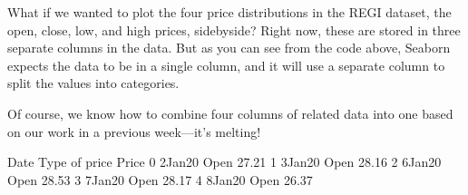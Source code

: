 \documentclass[letterpaper,10pt,english]{jupyterBook}
\begin{document}
\noindent{}

\sphinxAtStartPar
What if we wanted to plot the four price distributions in the REGI dataset, the open, close, low, and high prices, side\sphinxhyphen{}by\sphinxhyphen{}side?  Right now, these are stored in three separate columns in the data.  But as you can see from the code above, Seaborn expects the data to be in a single column, and it will use a separate column to split the values into categories.

\sphinxAtStartPar
Of course, we know how to combine four columns of related data into one based on our work in a previous week—it’s melting!

\begin{sphinxVerbatim}[commandchars=\\\{\}]
   \PYG{p}{[}\PYG{p}{]} \PYG{p}{[}\PYG{p}{]}
                            
\end{sphinxVerbatim}

\begin{sphinxVerbatim}[commandchars=\\\{\}]
       Date Type of price  Price
0  2\PYGZhy{}Jan\PYGZhy{}20          Open  27.21
1  3\PYGZhy{}Jan\PYGZhy{}20          Open  28.16
2  6\PYGZhy{}Jan\PYGZhy{}20          Open  28.53
3  7\PYGZhy{}Jan\PYGZhy{}20          Open  28.17
4  8\PYGZhy{}Jan\PYGZhy{}20          Open  26.37
\end{sphinxVerbatim}

\begin{sphinxVerbatim}[commandchars=\\\{\}]
    
  
\end{sphinxVerbatim}
\end{document}
